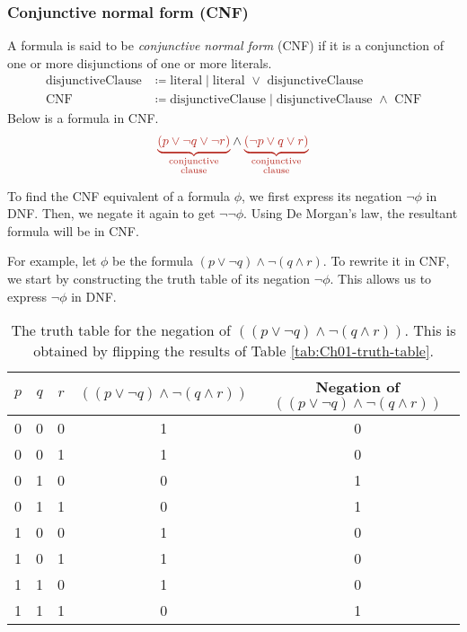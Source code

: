 \subsubsection{Conjunctive normal form (CNF)}

A formula is said to be \emph{conjunctive normal form} (CNF) if it is a conjunction of one or more disjunctions of one or more literals.
%
\begin{align*}
    \text{disjunctiveClause} &\coloneq \text{literal} \;\vert\; \text{literal } \lor \text{ disjunctiveClause}\\
    \text{CNF} &\coloneq \text{disjunctiveClause} \;\vert\; \text{disjunctiveClause } \land \text{ CNF}
\end{align*}
%
Below is a formula in CNF.
%
\[
    {\color{BrickRed}\underbrace{(p \lor \neg q \lor \neg r)}_{\substack{\text{conjunctive}\\\text{clause}}}}
    \land
    {\color{BrickRed}\underbrace{(\neg p \lor q \lor r)}_{\substack{\text{conjunctive}\\\text{clause}}}}
\]

To find the CNF equivalent of a formula \(\phi\), we first express its negation \(\neg\phi\) in DNF. Then, we negate it again to get \(\neg\neg\phi\). Using De Morgan's law, the resultant formula will be in CNF.

For example, let \(\phi\) be the formula \((p \lor \neg q) \land \neg (q \land r)\). To rewrite it in CNF, we start by constructing the truth table of its negation \(\neg\phi\). This allows us to express \(\neg\phi\) in DNF.

\begin{table}[H]
    \centering
    \begin{tabular}{|c|c|c||c|c|}
        \hline
        \(p\) & \(q\) & \(r\) & \(((p \lor \neg q) \land \neg (q \land r))\) & Negation of \(((p \lor \neg q) \land \neg (q \land r))\)\\
        \hline
        0 & 0 & 0 & 1 & 0 \\
        \hline
        0 & 0 & 1 & 1 & 0 \\
        \hline
        0 & 1 & 0 & 0 & 1 \\
        \hline
        0 & 1 & 1 & 0 & 1 \\
        \hline
        1 & 0 & 0 & 1 & 0 \\
        \hline
        1 & 0 & 1 & 1 & 0 \\
        \hline
        1 & 1 & 0 & 1 & 0 \\
        \hline
        1 & 1 & 1 & 0 & 1 \\
        \hline
    \end{tabular}

    \caption{The truth table for the negation of \(((p \lor \neg q) \land \neg (q \land r))\). This is obtained by flipping the results of Table \ref{tab:Ch01-truth-table}.}
    \label{tab:Ch01-truth-table-of-negation}
\end{table}

